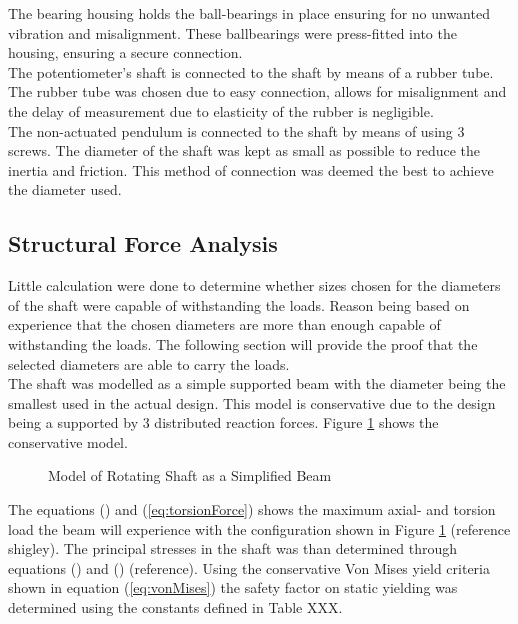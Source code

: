 The bearing housing holds the ball-bearings in place ensuring for no unwanted vibration and misalignment. These ballbearings were press-fitted into the housing, ensuring a secure connection.\\

The potentiometer's shaft is connected to the shaft by means of a rubber tube. The rubber tube was chosen due to easy connection, allows for misalignment and the delay of measurement due to elasticity of the rubber is negligible. \\

The non-actuated pendulum is connected to the shaft by means of using 3 screws. The diameter of the shaft was kept as small as possible to reduce the inertia and friction. This method of connection was deemed the best to achieve the diameter used.

\subsection{Structural Force Analysis}
Little calculation were done to determine whether sizes chosen for the diameters of the shaft were capable of withstanding the loads. Reason being based on experience that the chosen diameters are more than enough capable of withstanding the loads. The following section will provide the proof that the selected diameters are able to carry the loads.\\

The shaft was modelled as a simple supported beam with the diameter being the smallest used in the actual design. This model is conservative due to the design being a supported by 3 distributed reaction forces. Figure \ref{fig:supp_beam} shows the conservative model.

\begin{figure}[h]
	\centering
	
	\caption{Model of Rotating Shaft as a Simplified Beam}
	\label{fig:supp_beam}
\end{figure}

The equations () and (\ref{eq:torsionForce}) shows the maximum axial- and torsion load the beam will experience with the configuration shown in Figure \ref{fig:supp_beam} (reference shigley). The principal stresses in the shaft was than determined through equations () and () (reference). Using the conservative Von Mises yield criteria shown in equation (\ref{eq:vonMises}) the safety factor on static yielding was determined using the constants defined in Table XXX.

